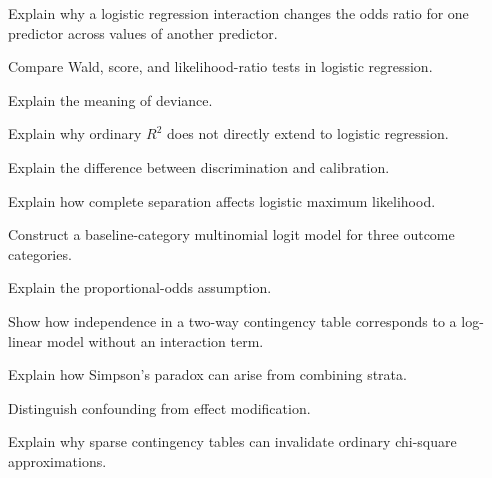 \begin{exercise}[3]
Explain why a logistic regression interaction changes the odds ratio for
one predictor across values of another predictor.
\end{exercise}

\begin{exercise}[3]
Compare Wald, score, and likelihood-ratio tests in logistic regression.
\end{exercise}

\begin{exercise}[3]
Explain the meaning of deviance.
\end{exercise}

\begin{exercise}[3]
Explain why ordinary \(R^2\) does not directly extend to logistic
regression.
\end{exercise}

\begin{exercise}[3]
Explain the difference between discrimination and calibration.
\end{exercise}

\begin{exercise}[3]
Explain how complete separation affects logistic maximum likelihood.
\end{exercise}

\begin{exercise}[3]
Construct a baseline-category multinomial logit model for three outcome
categories.
\end{exercise}

\begin{exercise}[3]
Explain the proportional-odds assumption.
\end{exercise}

\begin{exercise}[3]
Show how independence in a two-way contingency table corresponds to a
log-linear model without an interaction term.
\end{exercise}

\begin{exercise}[3]
Explain how Simpson's paradox can arise from combining strata.
\end{exercise}

\begin{exercise}[3]
Distinguish confounding from effect modification.
\end{exercise}

\begin{exercise}[3]
Explain why sparse contingency tables can invalidate ordinary chi-square
approximations.
\end{exercise}

